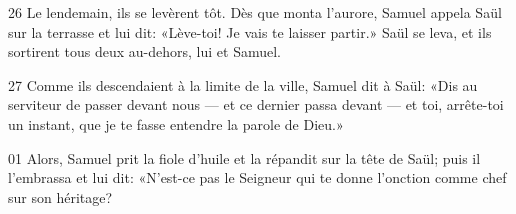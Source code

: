 
26 Le lendemain, ils se levèrent tôt. Dès que monta l’aurore, Samuel appela Saül sur la terrasse et lui dit: «Lève-toi! Je vais te laisser partir.» Saül se leva, et ils sortirent tous deux au-dehors, lui et Samuel.

27 Comme ils descendaient à la limite de la ville, Samuel dit à Saül: «Dis au serviteur de passer devant nous --- et ce dernier passa devant --- et toi, arrête-toi un instant, que je te fasse entendre la parole de Dieu.»

01 Alors, Samuel prit la fiole d’huile et la répandit sur la tête de Saül; puis il l’embrassa et lui dit: «N’est-ce pas le Seigneur qui te donne l’onction comme chef sur son héritage?

